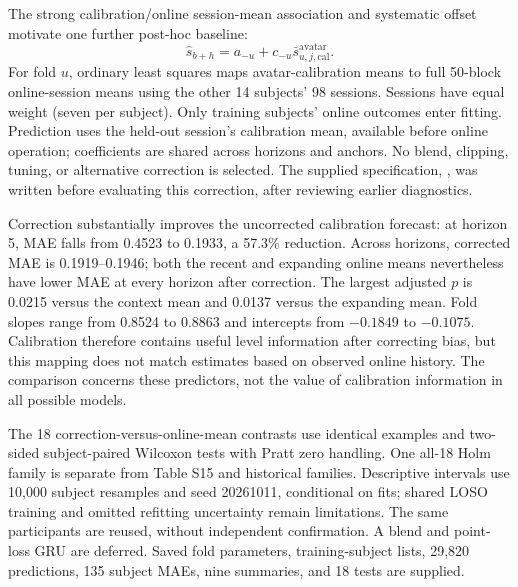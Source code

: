 \documentclass[a4paper,10pt,onecolumn]{IEEEtran}
\begin{document}
The strong calibration/online session-mean association and systematic offset
motivate one further post-hoc baseline:
\begin{equation}
\hat s_{b+h}=a_{-u}+c_{-u}\bar s^{\mathrm{avatar}}_{u,j,\mathrm{cal}}.
\end{equation}
For fold $u$, ordinary least squares maps avatar-calibration means to full
50-block online-session means using the other 14 subjects' 98 sessions.
Sessions have equal weight (seven per subject). Only training subjects' online
outcomes enter fitting. Prediction uses the held-out session's calibration
mean, available before online operation; coefficients are shared across
horizons and anchors. No blend, clipping, tuning, or alternative correction
is selected. The supplied specification,
, was written before
evaluating this correction, after reviewing earlier diagnostics.



Correction substantially improves the uncorrected calibration forecast:
at horizon 5, MAE falls from 0.4523 to 0.1933, a 57.3\% reduction.
Across horizons, corrected MAE is 0.1919--0.1946; both the recent and expanding
online means nevertheless have lower MAE at every horizon after correction.
The largest adjusted $p$ is 0.0215 versus the context mean and 0.0137 versus
the expanding mean. Fold slopes range from 0.8524 to 0.8863 and intercepts
from $-0.1849$ to $-0.1075$. Calibration therefore contains useful level
information after correcting bias, but this mapping does not match estimates
based on observed online history. The comparison concerns these predictors,
not the value of calibration information in all possible models.



The 18 correction-versus-online-mean contrasts use identical examples and
two-sided subject-paired Wilcoxon tests with Pratt zero handling. One all-18
Holm family is separate from Table S15 and historical families. Descriptive
intervals use 10,000 subject resamples and seed 20261011, conditional on fits;
shared LOSO training and omitted refitting uncertainty remain limitations.
The same participants are reused, without independent confirmation. A blend
and point-loss GRU are deferred. Saved fold parameters, training-subject lists,
29,820 predictions, 135 subject MAEs, nine summaries, and 18 tests are supplied.
\end{document}
